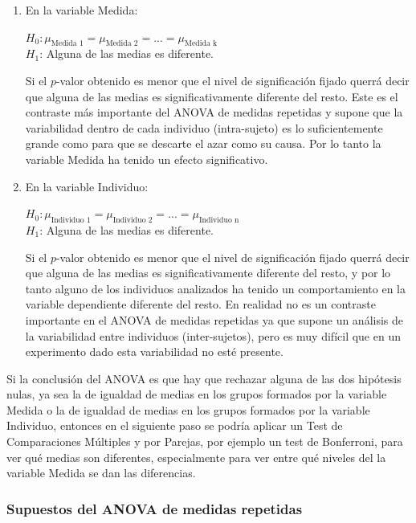 \documentclass[
  a4paper,
]{scrreport}
\theoremstyle{plain}
\theoremstyle{definition}
\theoremstyle{definition}
\theoremstyle{remark}
\begin{document}
\begin{enumerate}
\def\labelenumi{\arabic{enumi}.}
\item
  En la variable Medida:

  \(H_0: \mu_{\text{Medida 1}}=\mu_{\text{Medida 2}}=...=\mu_{\text{Medida k}}\)\\
  \(H_1\): Alguna de las medias es diferente.

  Si el \(p\)-valor obtenido es menor que el nivel de significación
  fijado querrá decir que alguna de las medias es significativamente
  diferente del resto. Este es el contraste más importante del ANOVA de
  medidas repetidas y supone que la variabilidad dentro de cada
  individuo (intra-sujeto) es lo suficientemente grande como para que se
  descarte el azar como su causa. Por lo tanto la variable Medida ha
  tenido un efecto significativo.
\item
  En la variable Individuo:

  \(H_0: \mu_{\text{Individuo 1}}=\mu_{\text{Individuo 2}}=...=\mu_{\text{Individuo n}}\)\\
  \(H_1\): Alguna de las medias es diferente.

  Si el \(p\)-valor obtenido es menor que el nivel de significación
  fijado querrá decir que alguna de las medias es significativamente
  diferente del resto, y por lo tanto alguno de los individuos
  analizados ha tenido un comportamiento en la variable dependiente
  diferente del resto. En realidad no es un contraste importante en el
  ANOVA de medidas repetidas ya que supone un análisis de la
  variabilidad entre individuos (inter-sujetos), pero es muy difícil que
  en un experimento dado esta variabilidad no esté presente.
\end{enumerate}

Si la conclusión del ANOVA es que hay que rechazar alguna de las dos
hipótesis nulas, ya sea la de igualdad de medias en los grupos formados
por la variable Medida o la de igualdad de medias en los grupos formados
por la variable Individuo, entonces en el siguiente paso se podría
aplicar un Test de Comparaciones Múltiples y por Parejas, por ejemplo un
test de Bonferroni, para ver qué medias son diferentes, especialmente
para ver entre qué niveles del la variable Medida se dan las
diferencias.

\subsubsection{Supuestos del ANOVA de medidas
repetidas}\label{supuestos-del-anova-de-medidas-repetidas}
\end{document}
